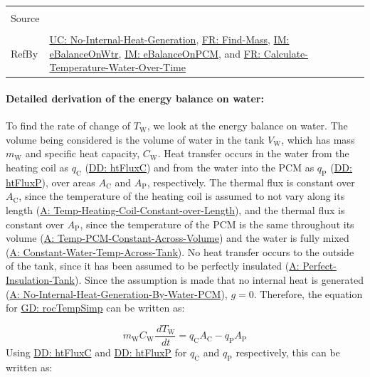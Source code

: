 \documentclass[12pt]{article}
\begin{document}
\begin{minipage}{\textwidth}
\begin{tabular}{>{\raggedright}p{}>{\raggedright\arraybackslash}p{}}
\\ \midrule \\
Source & \cite{koothoor2013}
         
\\ \midrule \\
RefBy & \hyperref[unlikeChgNIHG]{UC: No-Internal-Heat-Generation}, \hyperref[findMass]{FR: Find-Mass}, \hyperref[IM:eBalanceOnWtr]{IM: eBalanceOnWtr}, \hyperref[IM:eBalanceOnPCM]{IM: eBalanceOnPCM}, and \hyperref[calcTempWtrOverTime]{FR: Calculate-Temperature-Water-Over-Time}
        
\\ \bottomrule
\end{tabular}
\end{minipage}
\paragraph{Detailed derivation of the energy balance on water:}
\label{IM:eBalanceOnWtrDeriv}
To find the rate of change of ${T_{\text{W}}}$, we look at the energy balance on water. The volume being considered is the volume of water in the tank ${V_{\text{W}}}$, which has mass ${m_{\text{W}}}$ and specific heat capacity, ${C_{\text{W}}}$. Heat transfer occurs in the water from the heating coil as ${q_{\text{C}}}$ (\hyperref[DD:htFluxC]{DD: htFluxC}) and from the water into the PCM as ${q_{\text{P}}}$ (\hyperref[DD:htFluxP]{DD: htFluxP}), over areas ${A_{\text{C}}}$ and ${A_{\text{P}}}$, respectively. The thermal flux is constant over ${A_{\text{C}}}$, since the temperature of the heating coil is assumed to not vary along its length (\hyperref[assumpTHCCoL]{A: Temp-Heating-Coil-Constant-over-Length}), and the thermal flux is constant over ${A_{\text{P}}}$, since the temperature of the PCM is the same throughout its volume (\hyperref[assumpTPCAV]{A: Temp-PCM-Constant-Across-Volume}) and the water is fully mixed (\hyperref[assumpCWTAT]{A: Constant-Water-Temp-Across-Tank}). No heat transfer occurs to the outside of the tank, since it has been assumed to be perfectly insulated (\hyperref[assumpPIT]{A: Perfect-Insulation-Tank}). Since the assumption is made that no internal heat is generated (\hyperref[assumpNIHGBWP]{A: No-Internal-Heat-Generation-By-Water-PCM}), $g=0$. Therefore, the equation for \hyperref[GD:rocTempSimp]{GD: rocTempSimp} can be written as:

\begin{displaymath}
{m_{\text{W}}} {C_{\text{W}}} \frac{\,d{T_{\text{W}}}}{\,dt}={q_{\text{C}}} {A_{\text{C}}}-{q_{\text{P}}} {A_{\text{P}}}
\end{displaymath}
Using \hyperref[DD:htFluxC]{DD: htFluxC} and \hyperref[DD:htFluxP]{DD: htFluxP} for ${q_{\text{C}}}$ and ${q_{\text{P}}}$ respectively, this can be written as:
\end{document}
